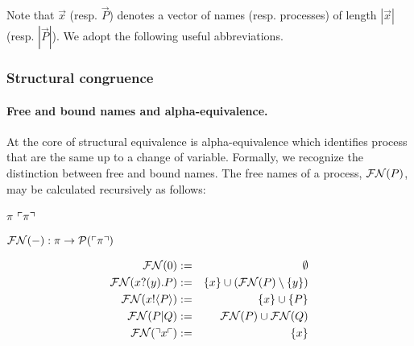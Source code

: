 \documentclass[12pt]{llncs}
\begin{document}
Note that $\vec{x}$ (resp. $\vec{P}$) denotes a vector of names
(resp. processes) of length $|\vec{x}|$ (resp. $|\vec{P}|$). We adopt
the following useful abbreviations.


\subsubsection{Structural congruence}

\paragraph{Free and bound names and alpha-equivalence.} At the
core of structural equivalence is alpha-equivalence which identifies
process that are the same up to a change of variable. Formally, we
recognize the distinction between free and bound names. The free names
of a process, $\mathbin{\mathcal{FN}(P)}$, may be calculated recursively as
follows:


$\pi$
$\ulcorner \pi \urcorner$

$\mathbin{\mathcal{FN}(-)} : \pi \to \mathcal{P}(\ulcorner \pi \urcorner)$

\begin{eqnarray*}
  \mathbin{\mathcal{FN}(\mathbin{0})} & := & \emptyset \\
  \mathbin{\mathcal{FN}(x?(y).P)} & := & \{ x \} \cup (\mathbin{\mathcal{FN}(P)} \setminus \{ y \}) \\
  \mathbin{\mathcal{FN}(x!\langle P \rangle)} & := & \{ x \} \cup \{ P \} \\
  \mathbin{\mathcal{FN}(P|Q)} & := & \mathbin{\mathcal{FN}(P)} \cup \mathbin{\mathcal{FN}(Q)} \\
  \mathbin{\mathcal{FN}(\urcorner x \ulcorner)} & := & \{ x \}
\end{eqnarray*}
\end{document}
